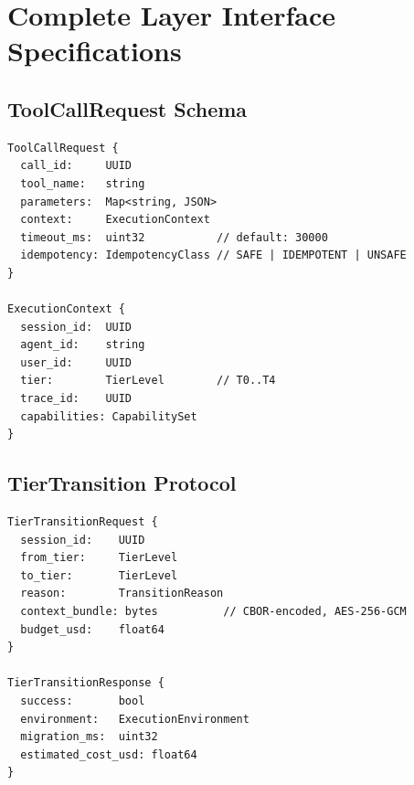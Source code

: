 \section{Complete Layer Interface Specifications}

\label{app:interfaces}

\subsection{ToolCallRequest Schema}

\begin{verbatim}
ToolCallRequest {
  call_id:     UUID
  tool_name:   string
  parameters:  Map<string, JSON>
  context:     ExecutionContext
  timeout_ms:  uint32           // default: 30000
  idempotency: IdempotencyClass // SAFE | IDEMPOTENT | UNSAFE
}

ExecutionContext {
  session_id:  UUID
  agent_id:    string
  user_id:     UUID
  tier:        TierLevel        // T0..T4
  trace_id:    UUID
  capabilities: CapabilitySet
}
\end{verbatim}

\subsection{TierTransition Protocol}

\begin{verbatim}
TierTransitionRequest {
  session_id:    UUID
  from_tier:     TierLevel
  to_tier:       TierLevel
  reason:        TransitionReason
  context_bundle: bytes          // CBOR-encoded, AES-256-GCM
  budget_usd:    float64
}

TierTransitionResponse {
  success:       bool
  environment:   ExecutionEnvironment
  migration_ms:  uint32
  estimated_cost_usd: float64
}
\end{verbatim}

